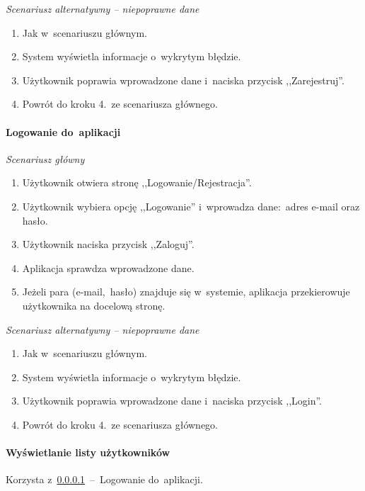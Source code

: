 \textit{Scenariusz alternatywny -- niepoprawne dane}

\begin{enumerate}
\item[1-4.] Jak w~scenariuszu głównym.
\item[5.] System wyświetla informacje o~wykrytym błędzie.
\item[6.] Użytkownik poprawia wprowadzone dane i~naciska przycisk ,,Zarejestruj''.
\item[7.] Powrót do kroku 4.~ze scenariusza głównego.
\end{enumerate}

\paragraph{Logowanie do~aplikacji\newline}
\label{par:login}

\textit{Scenariusz główny}

\begin{enumerate}
\item Użytkownik otwiera stronę ,,Logowanie/Rejestracja''.
\item Użytkownik wybiera opcję ,,Logowanie'' i~wprowadza dane:~adres e-mail oraz hasło.
\item Użytkownik naciska przycisk ,,Zaloguj''.
\item Aplikacja sprawdza wprowadzone dane.
\item Jeżeli para (e-mail,~hasło) znajduje się w~systemie, aplikacja przekierowuje użytkownika na docelową stronę.
\end{enumerate}

\textit{Scenariusz alternatywny -- niepoprawne dane}

\begin{enumerate}
\item[1-4.] Jak w~scenariuszu głównym.
\item[5.] System wyświetla informacje o~wykrytym błędzie.
\item[6.] Użytkownik poprawia wprowadzone dane i~naciska przycisk ,,Login''.
\item[7.] Powrót do kroku 4.~ze scenariusza głównego.
\end{enumerate}

\paragraph{Wyświetlanie listy użytkowników\newline}
\label{par:userList}
Korzysta z~\ref{par:login}~--~Logowanie do~aplikacji.\\

